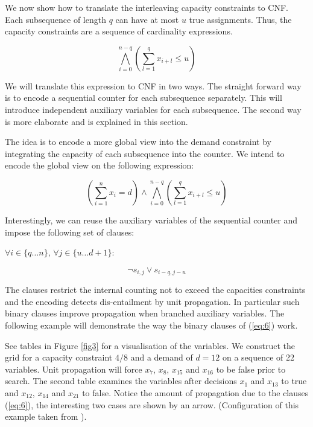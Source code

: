 \documentclass[]{llncs}
\begin{document}
We now show how to translate the interleaving capacity constraints to CNF. Each subsequence of length $q$ can have at
most $u$ true assignments. Thus, the capacity constraints are a sequence of cardinality expressions. 

$$\bigwedge_{i=0}^{n-q}(\sum_{l=1}^q x_{i+l} \leq u )$$

We will translate this expression to CNF in two ways. The straight forward way is to encode a sequential counter for
each subsequence separately. This will introduce independent auxiliary variables for each subsequence. The second way is
more elaborate and is explained in this section.

The idea is to encode a more global view into the demand constraint by integrating the capacity of each subsequence into
the counter. We intend to encode the global view on the following expression: 

$$ (\sum_{i=1}^n x_{i} = d) \wedge \bigwedge_{i=0}^{n-q}(\sum_{l=1}^q x_{i+l} \leq u )$$

Interestingly, we can reuse the auxiliary variables of the sequential counter and impose the following set of clauses: 

$\forall {i \in \{q \ldots n\}}$, $\forall {j\in\{u\ldots d+1\}}$: 

\begin{equation} \label{eq:6}
    \neg s_{i,j} \vee s_{i-q,j-u}
\end{equation}               

The clauses restrict the internal counting not to exceed the capacities constraints and the encoding detects
dis-entailment by unit propagation. In particular such binary clauses  improve propagation when branched auxiliary
variables.  The following example will demonstrate the way the binary clauses of (\ref{eq:6}) work. 

\begin{example}
\label{ex:large} See tables in Figure \ref{fig3} for a visualisation of the variables. We construct the grid for a
capacity constraint $4/8$ and a demand of $d=12$ on a sequence of 22 variables. Unit propagation will force $x_{7}$,
$x_{8}$, $x_{15}$ and $x_{16}$ to be false prior to search. The second table examines the variables after decisions
$x_{1}$ and $x_{13}$ to true and $x_{12}$, $x_{14}$ and $x_{21}$ to false. Notice the amount of propagation due to the
clauses (\ref{eq:6}), the interesting two cases are shown by an arrow. (Configuration of this example taken from
\cite{Siala12}). 
\end{example}
\end{document}

